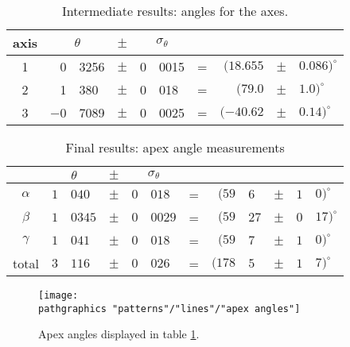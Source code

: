   \begin{table}[htbp]  %
    \caption{Intermediate results: angles for the axes.}
    \begin{center}
      \begin{tabular}{c r@{.}l c r@{.}l c rcl}
        axis & \multicolumn{2}{c}{$\theta$} & $\pm$ & \multicolumn{2}{c}{$\sigma_{\theta}$} \\\hline
        1 &   0 & 3256  & $\pm$ &  0 & 0015 & = & $(18.655$ & $\pm$ & $0.086)^{\circ}$\\
        2 &   1 & 380   & $\pm$ &  0 & 018  & = & $(79.0$ & $\pm$ & $1.0)^{\circ}$ \\
        3 & $-$0 & 7089  & $\pm$ &  0 & 0025 & = & $(-40.62$ & $\pm$ & $0.14)^{\circ}$
      \end{tabular}
    \end{center}
  \end{table}%

  \begin{table}[htbp]  %
    \caption{Final results: apex angle measurements}
    \begin{center}
      \begin{tabular}{c r@{.}l c r@{.}l c r@{.}l c r@{.}l}
        & \multicolumn{2}{c}{$\theta$} & $\pm$ & \multicolumn{2}{c}{$\sigma_{\theta}$} \\\hline
        $\alpha$ & $1$ & $040$  & $\pm$ & $0$ & $018$  & = & $(59$ & $6$ & $\pm$ & $1$ & $0)^{\circ}$\\
        $\beta$  & $1$ & $0345$ & $\pm$ & $0$ & $0029$ & = & $(59$ & $27$ & $\pm$ & $0$ & $17)^{\circ}$\\
        $\gamma$ & $1$ & $041$  & $\pm$ & $0$ & $018$  & = & $(59$ & $7$ & $\pm$ & $1$ & $0)^{\circ}$\\\arrayrulecolor{medgray}\hline
        total    & $3$ & $116$  & $\pm$ & $0$ & $026$  & = & $(178$ & $5$ & $\pm$ & $1$ & $7)^{\circ}$
      \end{tabular}
    \end{center}
  \label{tab:apex angles}
  \end{table}%

\begin{figure}[htbp] %
   \centering
   \texttt{[image: \\pathgraphics "patterns"/"lines"/"apex angles"]} 
   \caption{Apex angles displayed in table \ref{tab:apex angles}.}
   \label{fig:pattern needles}
\end{figure}

\endinput